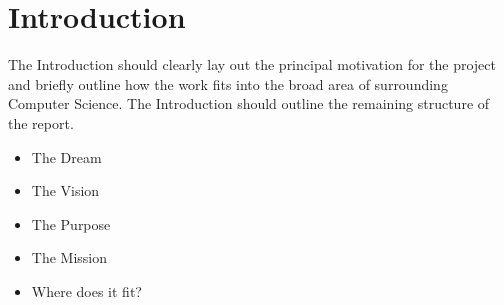 \chapter{Introduction}
\label{introduction}


The Introduction should clearly lay out the principal motivation for the project
and briefly outline how the work fits into the broad area of surrounding
Computer Science. The Introduction should outline the remaining structure of
the report.

\begin{itemize}
  \item The Dream
  \item The Vision
  \item The Purpose
  \item The Mission
	\item Where does it fit?
\end{itemize}




